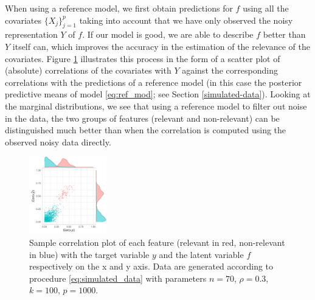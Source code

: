 \documentclass[american,]{article}
\theoremstyle{definition}
\begin{document}
When using a reference model, we first obtain predictions for $f$
using all the covariates $\{X_{j}\}_{j=1}^{p}$ taking into account
that we have only observed the noisy representation $Y$ of $f$. If our
model is good, we are able to describe $f$ better than $Y$ itself can,
which improves the accuracy in the estimation of the relevance of the
covariates.  Figure \ref{fig:correlation} illustrates this process in
the form of a scatter plot of (absolute) correlations of the
covariates with $Y$ against the corresponding correlations with the
predictions of a reference model (in this case the posterior
predictive means of model \eqref{eq:ref_mod}; see Section
\ref{simulated-data}). Looking at the marginal distributions, we see
that using a reference model to filter out noise in the data, the two
groups of features (relevant and non-relevant) can be distinguished
much better than when the correlation is computed using the observed
noisy data directly.

\begin{figure}[tp]
  \centering
  \includegraphics[width=0.3\textwidth]{graphics/correlation.pdf}
  \caption{Sample correlation plot of each feature (relevant in red, non-relevant in blue) with the target variable $y$ and the latent variable $f$ respectively on the x and y axis. Data are generated according to procedure \eqref{eq:simulated_data} with parameters $n=70$, $\rho=0.3$, $k=100$, $p=1000$.\\}
  \label{fig:correlation}
\end{figure}
\end{document}
